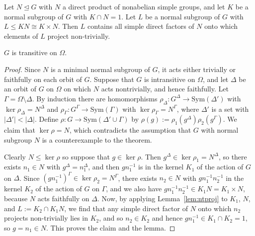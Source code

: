 \documentclass[10pt,a4paper]{amsart}
\newcommand{\Sym}{\mathrm{Sym}}
\begin{document}
\begin{lemma}\label{lem:ntproj}
Let $N \unlhd G$ with $N$ a direct product of nonabelian
simple groups,
and let $K$ be a normal subgroup of $G$ with $K \cap N = 1$. Let $L$ be a normal
subgroup of $G$ with $L \le KN \cong K \times N$. Then $L$ contains all simple
direct factors of $N$ onto which elements of $L$ project non-trivially.
\end{lemma}

\begin{lemma} $G$ is transitive on $\Omega$.
\end{lemma}

\begin{proof}
Since $N$ is a minimal normal subgroup of $G$, it acts either
trivially or faithfully on each orbit of $G$.
Suppose that $G$ is intransitive on $\Omega$, and let $\Delta$ be an
orbit of $G$ on $\Omega$ on which $N$ acts nontrivially, and hence faithfully.
Let $\Gamma = \Omega \setminus \Delta$.  By induction there are homomorphisms
$\rho_\Delta: G^\Delta \to \Sym(\Delta')$ with $\ker \rho_\Delta = N^\Delta$ and
$\rho_\Gamma: G^\Gamma \to \Sym(\Gamma)$ with $\ker \rho_\Gamma = N^\Gamma$,
where $\Delta'$ is a set with $|\Delta'|<|\Delta|$.
Define $\rho:G \to \Sym(\Delta' \cup \Gamma)$ by
$\rho(g) := \rho_1(g^\Delta)\rho_2(g^\Gamma)$.
We claim that $\ker \rho = N$, which contradicts the assumption that $G$ with
normal subgroup $N$ is a counterexample to the theorem.

Clearly $N \le \ker \rho$ so suppose that $g \in \ker \rho$.
Then $g^{\Delta} \in \ker \rho_1 = N^\Delta$, so there exists
$n_1 \in N$ with $g^\Delta = n_1^\Delta$, and then $gn_1^{-1}$
is in the kernel $K_1$ of the action of $G$ on $\Delta$.
Since $(gn_1^{-1})^\Gamma \in \ker \rho_2 = N^\Gamma$, there exists
$n_2 \in N$ with $gn_1^{-1}n_2^{-1}$ in the kernel $K_2$ of the action of
$G$ on $\Gamma$, and we also have
$gn_1^{-1}n_2^{-1} \in K_1 N = K_1 \times N$, because $N$ acts
faithfully on $\Delta$.
Now, by applying Lemma~\ref{lem:ntproj} to $K_1$, $N$, and
$L:=K_2 \cap K_1 N$, we find that any simple direct factor of $N$
onto which $n_2$ projects non-trivially lies in $K_2$, and so
$n_2 \in K_2$ and hence $gn_1^{-1} \in K_1 \cap K_2=1$,
so $g=n_1 \in N$.  This proves the claim and the lemma.
\end{proof}
\end{document}
